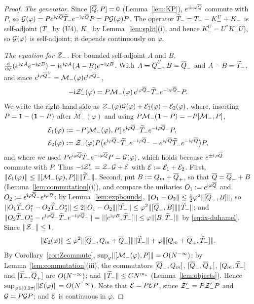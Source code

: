\begin{proof}
\emph{The generator.} Since $[\overline{Q},P]=0$ (Lemma~\ref{lem:KP}), $e^{\pm\mathrm{i}\varphi\overline{Q}}$ commute with $P$, so
$\mathcal{G}(\varphi)=Pe^{\mathrm{i}\varphi\overline{Q}}\widetilde{T}_{-} e^{-\mathrm{i}\varphi\overline{Q}}P=P\mathcal{G}(\varphi)P$. The operator $\widetilde{T}_{-}=T_--K^U_-+K_-$ is self-adjoint ($T_-$
by (U4), $K_-$ by Lemma~\ref{lem:split}(i), and hence $K^U_-=U^*K_-U$), so $\mathcal{G}(\varphi)$ is self-adjoint; it depends
continuously on $\varphi$.

\emph{The equation for $\mathcal{Z}_{-}$.} For bounded self-adjoint $A$ and $B$,
$\frac{\mathrm{d}}{\mathrm{d}\varphi}(e^{\mathrm{i}\varphi A}e^{-\mathrm{i}\varphi B})=\mathrm{i} e^{\mathrm{i}\varphi A}(A-B)e^{-\mathrm{i}\varphi B}$. With $A=\overline{Q}^U_-$, $B=\overline{Q}_-$ and
$A-B=\widetilde{T}_{-}$, and since $e^{\mathrm{i}\varphi\overline{Q}^U_-}=\mathcal M_-(\varphi)e^{\mathrm{i}\varphi\overline{Q}_-}$,
\[
-\mathrm{i}\mathcal{Z}_{-}'(\varphi)=P\mathcal M_-(\varphi)\,e^{\mathrm{i}\varphi\overline{Q}_-}\widetilde{T}_{-} e^{-\mathrm{i}\varphi\overline{Q}_-}P .
\]
We write the right-hand side as $\mathcal{Z}_{-}(\varphi)\mathcal{G}(\varphi)+\mathcal{E}_1(\varphi)+\mathcal{E}_2(\varphi)$, where, inserting $P=\mathbf{1}-(\mathbf{1}-P)$ after
$\mathcal M_-(\varphi)$ and using $P\mathcal M_-(\mathbf{1}-P)=-P[\mathcal M_-,P]$,
\begin{align*}
\mathcal{E}_1(\varphi)&:=-P[\mathcal M_-(\varphi),P]\,e^{\mathrm{i}\varphi\overline{Q}_-}\widetilde{T}_{-} e^{-\mathrm{i}\varphi\overline{Q}_-}P,\\
\mathcal{E}_2(\varphi)&:=\mathcal{Z}_{-}(\varphi)P\bigl(e^{\mathrm{i}\varphi\overline{Q}_-}\widetilde{T}_{-} e^{-\mathrm{i}\varphi\overline{Q}_-}-e^{\mathrm{i}\varphi\overline{Q}}\widetilde{T}_{-} e^{-\mathrm{i}\varphi\overline{Q}}\bigr)P ,
\end{align*}
and where we used $Pe^{\mathrm{i}\varphi\overline{Q}}\widetilde{T}_{-} e^{-\mathrm{i}\varphi\overline{Q}}P=\mathcal{G}(\varphi)$, which holds because $e^{\pm\mathrm{i}\varphi\overline{Q}}$ commute with $P$.
Thus $-\mathrm{i}\mathcal{Z}_{-}'=\mathcal{Z}_{-}\mathcal{G}+\mathcal{E}$ with $\mathcal{E}:=\mathcal{E}_1+\mathcal{E}_2$. First, $\lVert\mathcal{E}_1(\varphi)\rVert\le\lVert[\mathcal M_-(\varphi),P]\rVert\lVert\widetilde{T}_{-}\rVert$. Second, put
$B:=Q_m+\overline{Q}_+$, so that $\overline{Q}=\overline{Q}_-+B$ (Lemma~\ref{lem:commutation}(i)), and compare the unitaries $O_1:=e^{\mathrm{i}\varphi\overline{Q}}$ and
$O_2:=e^{\mathrm{i}\varphi\overline{Q}_-}e^{\mathrm{i}\varphi B}$: by Lemma~\ref{lem:expbounds}, $\lVert O_1-O_2\rVert\le\frac12\varphi^2\lVert[\overline{Q}_-,B]\rVert$, so
$\lVert O_1\widetilde{T}_{-} O_1^*-O_2\widetilde{T}_{-} O_2^*\rVert\le2\lVert O_1-O_2\rVert\lVert\widetilde{T}_{-}\rVert\le\varphi^2\lVert[\overline{Q}_-,B]\rVert\lVert\widetilde{T}_{-}\rVert$; and
$\lVert O_2\widetilde{T}_{-} O_2^*-e^{\mathrm{i}\varphi\overline{Q}_-}\widetilde{T}_{-} e^{-\mathrm{i}\varphi\overline{Q}_-}\rVert=\lVert[e^{\mathrm{i}\varphi B},\widetilde{T}_{-}]\rVert\le\varphi\lVert[B,\widetilde{T}_{-}]\rVert$ by
\eqref{eq:ix-duhamel}. Since $\lVert\mathcal{Z}_{-}\rVert\le1$,
\[
\lVert\mathcal{E}_2(\varphi)\rVert\le\varphi^2\lVert[\overline{Q}_-,Q_m+\overline{Q}_+]\rVert\lVert\widetilde{T}_{-}\rVert+\varphi\lVert[Q_m+\overline{Q}_+,\widetilde{T}_{-}]\rVert .
\]
By Corollary~\ref{cor:Zcommute}, $\sup_\varphi\lVert[\mathcal M_-(\varphi),P]\rVert=O(N^{-\infty})$; by Lemma~\ref{lem:commutation}(iii), the
commutators $[\overline{Q}_-,Q_m]$, $[\overline{Q}_-,\overline{Q}_+]$, $[Q_m,\widetilde{T}_{-}]$ and $[\widetilde{T}_{-},\overline{Q}_+]$ are $O(N^{-\infty})$; and $\lVert\widetilde{T}_{-}\rVert\le CN^{m_*}$
(Lemma~\ref{lem:objects}). Hence $\sup_{\varphi\in[0,2\pi]}\lVert\mathcal{E}(\varphi)\rVert=O(N^{-\infty})$. Note that $\mathcal{E}=P\mathcal{E} P$, since $\mathcal{Z}_{-}'=P\mathcal{Z}_{-}'P$
and $\mathcal{G}=P\mathcal{G} P$; and $\mathcal{E}$ is continuous in $\varphi$.


\end{proof}
